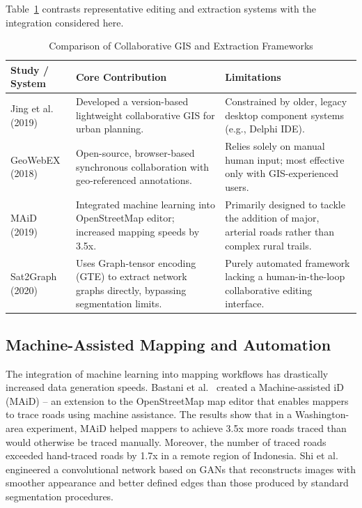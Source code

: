 \documentclass[10pt,a4paper,twocolumn]{article}
\begin{document}
Table~\ref{tab:lit_review} contrasts representative editing and extraction systems with the integration considered here.

\begin{table}[t]
\caption{Comparison of Collaborative GIS and Extraction Frameworks}
\begin{center}
\begin{tabularx}{\linewidth}{>{\hsize=0.6\hsize\raggedright\arraybackslash}X >{\hsize=1.2\hsize\raggedright\arraybackslash}X >{\hsize=1.2\hsize\raggedright\arraybackslash}X}
\toprule
\textbf{Study / System} & \textbf{Core Contribution} & \textbf{Limitations} \\
\midrule
Jing et al. (2019) & Developed a version-based lightweight collaborative GIS for urban planning. & Constrained by older, legacy desktop component systems (e.g., Delphi IDE). \\
\addlinespace
GeoWebEX (2018) & Open-source, browser-based synchronous collaboration with geo-referenced annotations. & Relies solely on manual human input; most effective only with GIS-experienced users. \\
\addlinespace
MAiD (2019) & Integrated machine learning into OpenStreetMap editor; increased mapping speeds by 3.5x. & Primarily designed to tackle the addition of major, arterial roads rather than complex rural trails. \\
\addlinespace
Sat2Graph (2020) & Uses Graph-tensor encoding (GTE) to extract network graphs directly, bypassing segmentation limits. & Purely automated framework lacking a human-in-the-loop collaborative editing interface. \\
\bottomrule
\end{tabularx}
\label{tab:lit_review}
\end{center}
\end{table}

\subsection{Machine-Assisted Mapping and Automation}

The integration of machine learning into mapping workflows has drastically increased data generation speeds. Bastani et al.~\cite{b6} created a Machine-assisted iD (MAiD) -- an extension to the OpenStreetMap map editor that enables mappers to trace roads using machine assistance. The results show that in a Washington-area experiment, MAiD helped mappers to achieve 3.5x more roads traced than would otherwise be traced manually. Moreover, the number of traced roads exceeded hand-traced roads by 1.7x in a remote region of Indonesia. Shi et al.~\cite{b8} engineered a convolutional network based on GANs that reconstructs images with smoother appearance and better defined edges than those produced by standard segmentation procedures.
\end{document}
